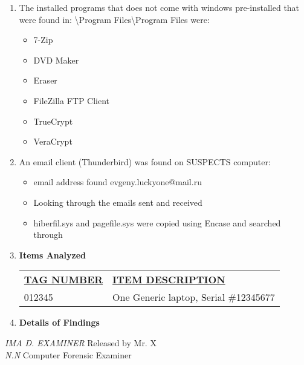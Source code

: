 \begin{enumerate}
		
		\item The installed programs that does not come with windows pre-installed that were found in:
		\textbackslash Program Files\textbackslash Program Files were:

		\begin{itemize}
			\item 7-Zip
			\item DVD Maker
			\item Eraser
			\item FileZilla FTP Client
			\item TrueCrypt
			\item VeraCrypt
		\end{itemize}


	\item An email client (Thunderbird) was found on SUSPECTS computer: 
		\begin{itemize}
			\item email address found evgeny.luckyone@mail.ru
			\item Looking through the emails sent and received 

		
		\item hiberfil.sys and pagefile.sys were copied using Encase and searched through
		
	\end{itemize}

\item \textbf{Items Analyzed}

\begin{longtable}{p{}p{}}
\textbf{\underline{TAG NUMBER}} & \textbf{\underline{ITEM DESCRIPTION}} \\
012345 & One Generic laptop, Serial \#12345677
\end{longtable}

\item \textbf{Details of Findings}

\end{enumerate}

\noindent \textit{IMA D. EXAMINER}	\hfill Released by {\wesa Mr. X}\\
\textit{N.N} Computer Forensic Examiner
\clearpage

